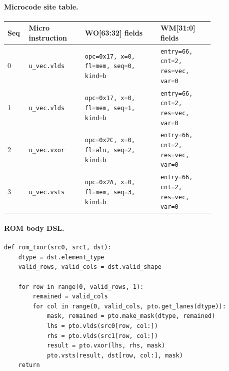 \paragraph{Microcode site table.}
{\scriptsize
\begin{longtable}{@{}R{0.055\linewidth}L{0.23\linewidth}L{0.31\linewidth}L{0.22\linewidth}@{}}
\toprule
Seq & Micro instruction & WO[63:32] fields & WM[31:0] fields \\
 & \texttt{u\_vec.vlds} & \texttt{opc=0x17, x=0, fl=mem, seq=0, kind=b} & \texttt{entry=66, cnt=2, res=vec, var=0} \\
1 & \texttt{u\_vec.vlds} & \texttt{opc=0x17, x=0, fl=mem, seq=1, kind=b} & \texttt{entry=66, cnt=2, res=vec, var=0} \\
2 & \texttt{u\_vec.vxor} & \texttt{opc=0x2C, x=0, fl=alu, seq=2, kind=b} & \texttt{entry=66, cnt=2, res=vec, var=0} \\
3 & \texttt{u\_vec.vsts} & \texttt{opc=0x2A, x=0, fl=mem, seq=3, kind=b} & \texttt{entry=66, cnt=2, res=vec, var=0} \\
\bottomrule
\end{longtable}
}
\paragraph{ROM body DSL.}
\begin{lstlisting}[style=ptocode]
def rom_txor(src0, src1, dst):
    dtype = dst.element_type
    valid_rows, valid_cols = dst.valid_shape

    for row in range(0, valid_rows, 1):
        remained = valid_cols
        for col in range(0, valid_cols, pto.get_lanes(dtype)):
            mask, remained = pto.make_mask(dtype, remained)
            lhs = pto.vlds(src0[row, col:])
            rhs = pto.vlds(src1[row, col:])
            result = pto.vxor(lhs, rhs, mask)
            pto.vsts(result, dst[row, col:], mask)
    return
\end{lstlisting}
\Needspace{0.34\textheight}
